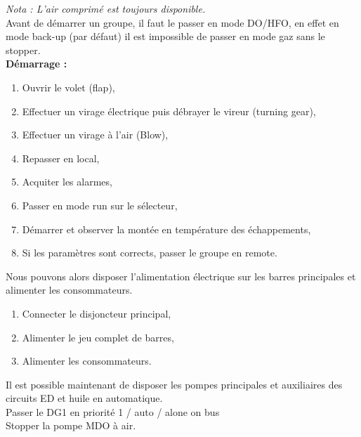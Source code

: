 \documentclass[12pt,a4paper]{article}
\begin{document}
\emph{Nota : L'air comprimé est toujours disponible.}\\
Avant de démarrer un groupe, il faut le passer en mode DO/HFO, en effet en mode back-up (par défaut) il est impossible de passer en mode gaz sans le stopper.\\
%
\textbf{Démarrage :}
\begin{enumerate}[resume]
 \item Ouvrir le volet (flap),
 \item Effectuer un virage électrique puis débrayer le vireur (turning gear),
 \item Effectuer un virage à l'air (Blow),
 \item Repasser en local,
 \item Acquiter les alarmes,
 \item Passer en mode run sur le sélecteur,
 \item Démarrer et observer la montée en température des échappements, 
 \item Si les paramètres sont corrects, passer le groupe en remote.
\end{enumerate}
Nous pouvons alors disposer l'alimentation électrique sur les barres principales et alimenter les consommateurs.
\begin{enumerate}[resume]
 \item Connecter le disjoncteur principal,
 \item Alimenter le jeu complet de barres,
 \item Alimenter les consommateurs.
\end{enumerate}
Il est possible maintenant de disposer les pompes principales et auxiliaires des circuits ED et huile en automatique.\\
Passer le DG1 en priorité 1 / auto / alone on bus\\
Stopper la pompe MDO à air.
\end{document}
